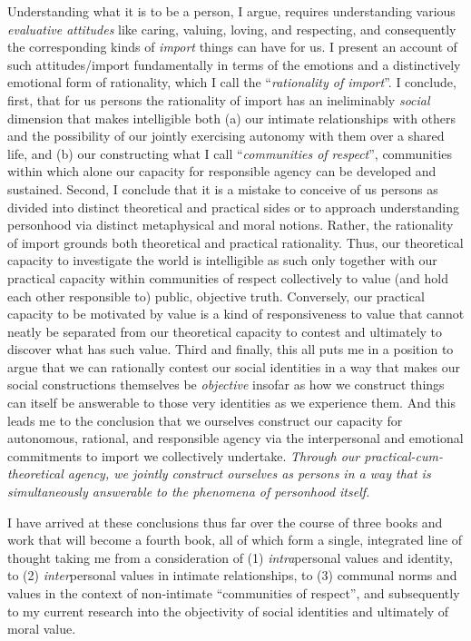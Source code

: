 \documentclass[11pt]{article}
\begin{document}
Understanding what it is to be a person, I argue, requires understanding various \emph{evaluative attitudes} like caring, valuing, loving, and respecting, and consequently the corresponding kinds of \emph{import} things can have for us. I present an account of such attitudes\slash import fundamentally in terms of the emotions and a distinctively emotional form of rationality, which I call the \enquote{\emph{rationality of import}}. I conclude, first, that for us persons the rationality of import has an ineliminably \emph{social} dimension that makes intelligible both (a) our intimate relationships with others and the possibility of our jointly exercising autonomy with them over a shared life, and (b) our constructing what I call \enquote{\emph{communities of respect}}, communities within which alone our capacity for responsible agency can be developed and sustained. Second, I conclude that it is a mistake to conceive of us persons as divided into distinct theoretical and practical sides or to approach understanding personhood via distinct metaphysical and moral notions. Rather, the rationality of import grounds both theoretical and practical rationality. Thus, our theoretical capacity to investigate the world is intelligible as such only together with our practical capacity within communities of respect collectively to value (and hold each other responsible to) public, objective truth. Conversely, our practical capacity to be motivated by value is a kind of responsiveness to value that cannot neatly be separated from our theoretical capacity to contest and ultimately to discover what has such value. Third and finally, this all puts me in a position to argue that we can rationally contest our social identities in a way that makes our social constructions themselves be \emph{objective} insofar as how we construct things can itself be answerable to those very identities as we experience them. And this leads me to the conclusion that we ourselves construct our capacity for autonomous, rational, and responsible agency via the interpersonal and emotional commitments to import we collectively undertake. \emph{Through our practical-cum-theoretical agency, we jointly construct ourselves as persons in a way that is simultaneously answerable to the phenomena of personhood itself.}

I have arrived at these conclusions thus far over the course of three books and work that will become a fourth book, all of which form a single, integrated line of thought taking me from a consideration of (1) \emph{intra}personal values and identity, to (2) \emph{inter}personal values in intimate relationships, to (3) communal norms and values in the context of non-intimate \enquote{communities of respect}, and subsequently to my current research into the objectivity of social identities and ultimately of moral value.
\end{document}
